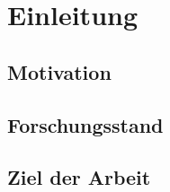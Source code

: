 \chapter{Einleitung}\label{einleitung}

\section{Motivation}\label{einleitung:motivation}

\section{Forschungsstand}\label{einleitung:forschung}

\section{Ziel der Arbeit}\label{einleitung:ziel}
